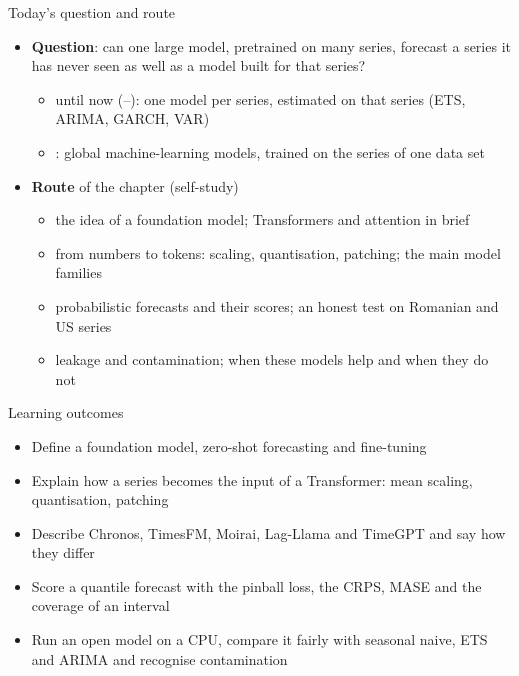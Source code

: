 \begin{frame}{Today's question and route}
\itemsize{\small}
\begin{itemize}
    \item \textbf{Question}: can one large model, pretrained on many series, forecast a series it has never seen as well as a model built for that series?
    \begin{itemize}
        \item until now (--): one model per series, estimated on that series (ETS, ARIMA, GARCH, VAR)
        \item {}: global machine-learning models, trained on the series of one data set
    \end{itemize}
    \item \textbf{Route} of the chapter (self-study)
    \begin{itemize}
        \item the idea of a foundation model; Transformers and attention in brief
        \item from numbers to tokens: scaling, quantisation, patching; the main model families
        \item probabilistic forecasts and their scores; an honest test on Romanian and US series
        \item leakage and contamination; when these models help and when they do not
    \end{itemize}
\end{itemize}
\end{frame}

\begin{frame}{Learning outcomes}
\itemsize{\small}
\begin{itemize}
    \item Define a foundation model, zero-shot forecasting and fine-tuning
    \item Explain how a series becomes the input of a Transformer: mean scaling, quantisation, patching
    \item Describe Chronos, TimesFM, Moirai, Lag-Llama and TimeGPT and say how they differ
    \item Score a quantile forecast with the pinball loss, the CRPS, MASE and the coverage of an interval
    \item Run an open model on a CPU, compare it fairly with seasonal naive, ETS and ARIMA and recognise contamination
\end{itemize}
\end{frame}

